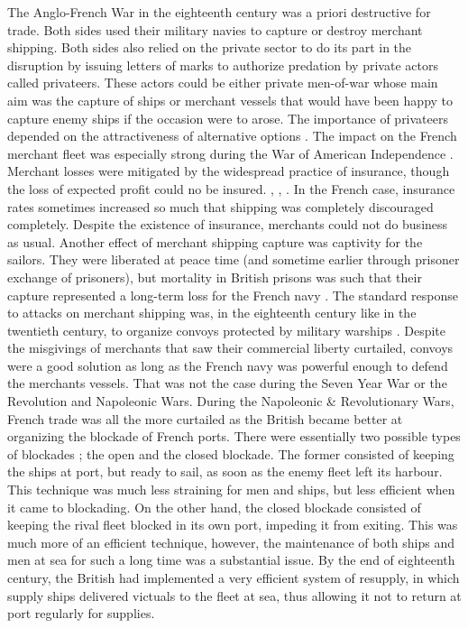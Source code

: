 \documentclass[12pt,a4paper,notitlepage,english]{article}
\begin{document}
The Anglo-French War in the eighteenth century was a priori destructive for trade.
Both sides used their military navies to capture  or destroy merchant shipping.
Both sides also relied on the private sector to do its part in the disruption by issuing letters of marks to authorize predation by private actors called privateers.
These actors could be either private men-of-war whose main aim was the capture of ships or merchant vessels that would have been happy to capture enemy ships if the occasion were to arose.
The importance of privateers depended on the attractiveness of alternative options \cite[p. 673]{Villiers2002,Hillmann2011}.
The impact on the French merchant fleet was especially strong during the War of American Independence \cite[table 1]{Hillmann2011}.
Merchant losses were mitigated by the widespread practice of insurance, though the loss of expected profit could no be insured. \cite[p. 160]{Ducoin1993}, \cite{Villiers2002}, \cite[p. 690-720]{Butel1973}.
In the French case, insurance rates sometimes increased so much that shipping was completely discouraged completely.
Despite the existence of insurance, merchants could not do business as usual.
Another effect of merchant shipping capture was captivity for the sailors.
They were liberated at peace time (and sometime earlier through prisoner exchange of prisoners), but mortality in British prisons was such that their capture represented a long-term loss for the French navy \cite{LeGoff1998}.
The standard response to attacks on merchant shipping was, in the eighteenth century like in the twentieth century, to organize convoys protected by military warships \cite[p. 393, 407, 448, 641]{Villiers2002}.
Despite the misgivings of merchants that saw their commercial liberty curtailed, convoys were a good solution as long as the French navy was powerful enough to defend the merchants vessels.
That was not the case during the Seven Year War or the Revolution and Napoleonic Wars.
During the Napoleonic \& Revolutionary Wars, French trade was all the more curtailed as the British became better at organizing the blockade of French ports.
There were essentially two possible types of blockades \citep{Corbett2004}; the open and the closed blockade.
The former consisted of keeping the ships at port, but ready to sail, as soon as the enemy fleet left its harbour.
This technique was much less straining for men and ships, but less efficient when it came to blockading.
On the other hand, the closed blockade consisted of keeping the rival fleet blocked in its own port, impeding it from exiting.
This was much more of an efficient technique, however, the maintenance of both ships and men at sea for such a long time was a substantial issue.
By the end of eighteenth century, the British had implemented a very efficient system of resupply, in which supply ships delivered victuals to the fleet at sea, thus allowing it not to return at port regularly for supplies.
\end{document}
